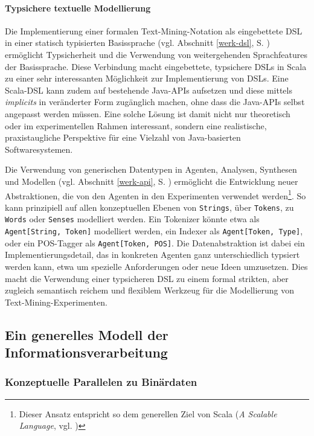 \documentclass[abstracton, 12pt]{scrartcl}
\begin{document}
\paragraph{Typsichere textuelle Modellierung}

Die Implementierung einer formalen Text-Mining-No\-ta\-tion als eingebettete DSL in einer statisch typisierten Basissprache (vgl. Abschnitt \ref{werk-dsl}, S. \pageref{werk-dsl}) ermöglicht Typsicherheit und die Verwendung von weitergehenden Sprachfeatures der Basissprache. Diese Verbindung macht eingebettete, typsichere DSLs in Scala zu einer sehr interessanten Möglichkeit zur Implementierung von DSLs. Eine Scala-DSL kann zudem auf bestehende Java-APIs aufsetzen und diese mittels \emph{implicits} in veränderter Form zugänglich machen, ohne dass die Java-APIs selbst angepasst werden müssen. Eine solche Lösung ist damit nicht nur theoretisch oder im experimentellen Rahmen interessant, sondern eine realistische, praxis\-taugliche Perspektive für eine Vielzahl von Java-basierten Softwaresystemen.

Die Verwendung von generischen Datentypen in Agenten, Analysen, Synthesen und Modellen (vgl. Abschnitt \ref{werk-api}, S. \pageref{werk-api}) ermöglicht die Entwicklung neuer Abstraktionen, die von den Agenten in den Experimenten verwendet werden\footnote{Dieser Ansatz entspricht so dem generellen Ziel von Scala (\emph{A Scalable Language}, vgl. \citealt[3]{OderskyEtAl2008})}. So kann prinzipiell auf allen konzeptuellen Ebenen von \lstinline!Strings!, über \lstinline!Tokens!, zu \lstinline!Words! oder \lstinline!Senses! modelliert werden. Ein Tokenizer könnte etwa als \lstinline!Agent[String, Token]! modelliert werden, ein Indexer als \lstinline!Agent[Token, Type]!, oder ein POS-Tagger als \lstinline!Agent[Token, POS]!. Die Datenabstraktion ist dabei ein Implementierungsdetail, das in konkreten Agenten ganz unterschiedlich typsiert werden kann, etwa um spezielle Anforderungen oder neue Ideen umzusetzen. Dies macht die Verwendung einer typsicheren DSL zu einem formal strikten, aber zugleich semantisch reichem und flexiblem Werkzeug für die Modellierung von Text-Mining-Experimenten.

\subsection{Ein generelles Modell der Informationsverarbeitung} \label{fazit-infomodell}  

\subsubsection{Konzeptuelle Parallelen zu Binärdaten} \label{xcl}
\end{document}
